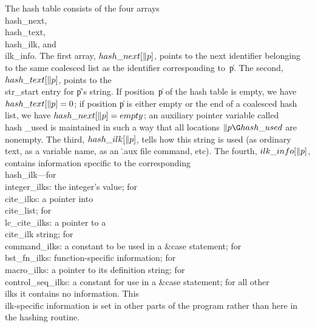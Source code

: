 The hash table consists of the four arrays \\{hash\_next}, \\{hash\_text},
\\{hash\_ilk}, and \\{ilk\_info}.  The first array, $\\{hash\_next}[\|p]$,
points
to the next identifier belonging to the same coalesced list as the
identifier corresponding to~\|p.  The second, $\\{hash\_text}[\|p]$, points
to the \\{str\_start} entry for \|p's string. If position~\|p of the hash
table is empty, we have $\\{hash\_text}[\|p]=0$; if position \|p is either
empty or the end of a coalesced hash list, we have
$\\{hash\_next}[\|p]=\\{empty}$; an auxiliary pointer variable called \\{hash%
\_used}
is maintained in such a way that all locations $\|p\G\\{hash\_used}$ are
nonempty.  The third, $\\{hash\_ilk}[\|p]$, tells how this string is used (as
ordinary text, as a variable name, as an \.{.aux} file command, etc).
The fourth, $\\{ilk\_info}[\|p]$, contains information specific to the
corresponding \\{hash\_ilk}---for \\{integer\_ilk}s: the integer's value;
for \\{cite\_ilk}s: a pointer into \\{cite\_list}; for \\{lc\_cite\_ilk}s: a
pointer to a \\{cite\_ilk} string; for \\{command\_ilk}s: a constant to be
used in a   \&{case}  statement; for \\{bst\_fn\_ilk}s: function-specific
information; for \\{macro\_ilk}s: a pointer to its definition string; for
\\{control\_seq\_ilk}s: a constant for use in a   \&{case}  statement; for all
other \\{ilk}s it contains no information.  This \\{ilk}-specific
information is set in other parts of the program rather than here in
the hashing routine.

